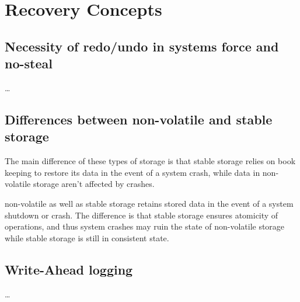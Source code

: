 
\section{Recovery Concepts}

\subsection{Necessity of redo/undo in systems force and no-steal}
\dots

\subsection{Differences between non-volatile and stable storage}
The main difference of these types of storage is that stable storage relies on
book keeping to restore its data in the event of a system crash, while data in
non-volatile storage aren't affected by crashes.

non-volatile as well as stable storage retains stored data in the event of a
system shutdown or crash. The difference is that stable storage ensures
atomicity of operations, and thus system crashes may ruin the state of
non-volatile storage while stable storage is still in consistent state.

\subsection{Write-Ahead logging}
\dots

